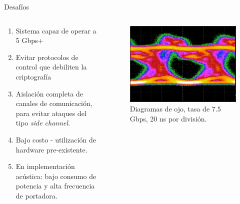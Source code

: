 \documentclass[aspectratio=169]{beamer}
\begin{document}
\begin{frame}{Desafíos}
\begin{columns}
  \begin{column}{0.60\textwidth}

\begin{enumerate}
 \item Sistema capaz de operar a 5 Gbps+
 \item Evitar protocolos de control que debiliten la criptografía
 \item Aislación completa de canales de comunicación, para evitar ataques del tipo \textit{side channel}.
 \item Bajo costo - utilización de hardware pre-existente.
 \item En implementación acústica: bajo consumo de potencia y alta frecuencia de portadora.
 \end{enumerate}

  \end{column}
  \begin{column}{0.40\textwidth}
 
 
 \begin{figure}[!t]
   \centering
   \includegraphics[width=0.80 \textwidth]{../graphs/medicionesPaper/eye71G.png}
   \qquad
   Diagramas de ojo, tasa de $7.5$ Gbps, 20 ns por división.
  \label{fig:ImgOjo}
\end{figure}


\end{column}
\end{columns}

\end{frame}

\end{document}
